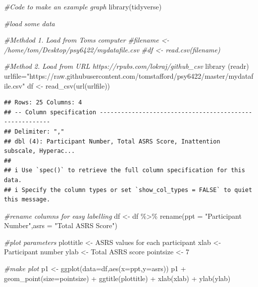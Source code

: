 \documentclass[
  12pt,
  a5paper,
]{book}
\newenvironment{Shaded}{\begin{snugshade}}{\end{snugshade}}
\newcommand{\AttributeTok}[1]{\textcolor[rgb]{0.77,0.63,0.00}{#1}}
\newcommand{\CommentTok}[1]{\textcolor[rgb]{0.56,0.35,0.01}{\textit{#1}}}
\newcommand{\DecValTok}[1]{\textcolor[rgb]{0.00,0.00,0.81}{#1}}
\newcommand{\FunctionTok}[1]{\textcolor[rgb]{0.00,0.00,0.00}{#1}}
\newcommand{\NormalTok}[1]{#1}
\newcommand{\OtherTok}[1]{\textcolor[rgb]{0.56,0.35,0.01}{#1}}
\newcommand{\SpecialCharTok}[1]{\textcolor[rgb]{0.00,0.00,0.00}{#1}}
\newcommand{\StringTok}[1]{\textcolor[rgb]{0.31,0.60,0.02}{#1}}
\begin{document}
\begin{Shaded}
\begin{Highlighting}[]
\CommentTok{\#Code to make an example graph}
\FunctionTok{library}\NormalTok{(tidyverse)}

\CommentTok{\#load some data}

\CommentTok{\#Methdod 1. Load from Tom\textquotesingle{}s computer}
\CommentTok{\#filename \textless{}{-} \textquotesingle{}/home/tom/Desktop/psy6422/mydatafile.csv\textquotesingle{}}
\CommentTok{\#df \textless{}{-} read.csv(filename)}

\CommentTok{\#Method 2. Load from URL https://rpubs.com/lokraj/github\_csv}
\FunctionTok{library}\NormalTok{ (readr)}
\NormalTok{urlfile}\OtherTok{=}\StringTok{"https://raw.githubusercontent.com/tomstafford/psy6422/master/mydatafile.csv"}
\NormalTok{df }\OtherTok{\textless{}{-}} \FunctionTok{read\_csv}\NormalTok{(}\FunctionTok{url}\NormalTok{(urlfile))}
\end{Highlighting}
\end{Shaded}

\begin{verbatim}
## Rows: 25 Columns: 4
## -- Column specification --------------------------------------------------------
## Delimiter: ","
## dbl (4): Participant Number, Total ASRS Score, Inattention subscale, Hyperac...
## 
## i Use `spec()` to retrieve the full column specification for this data.
## i Specify the column types or set `show_col_types = FALSE` to quiet this message.
\end{verbatim}

\begin{Shaded}
\begin{Highlighting}[]
\CommentTok{\#rename columns for easy labelling}
\NormalTok{df }\OtherTok{\textless{}{-}}\NormalTok{ df }\SpecialCharTok{\%\textgreater{}\%} \FunctionTok{rename}\NormalTok{(}\AttributeTok{ppt =} \StringTok{"Participant Number"}\NormalTok{,}\AttributeTok{asrs =} \StringTok{"Total ASRS Score"}\NormalTok{)}

\CommentTok{\#plot parameters}
\NormalTok{plottitle  }\OtherTok{\textless{}{-}}  \StringTok{\textquotesingle{}ASRS values for each participant\textquotesingle{}}
\NormalTok{xlab  }\OtherTok{\textless{}{-}}  \StringTok{\textquotesingle{}Participant number\textquotesingle{}}
\NormalTok{ylab  }\OtherTok{\textless{}{-}}  \StringTok{\textquotesingle{}Total ASRS score\textquotesingle{}}
\NormalTok{pointsize  }\OtherTok{\textless{}{-}}  \DecValTok{7}

\CommentTok{\#make plot}
\NormalTok{p1 }\OtherTok{\textless{}{-}} \FunctionTok{ggplot}\NormalTok{(}\AttributeTok{data=}\NormalTok{df,}\FunctionTok{aes}\NormalTok{(}\AttributeTok{x=}\NormalTok{ppt,}\AttributeTok{y=}\NormalTok{asrs))}
\NormalTok{p1 }\SpecialCharTok{+} \FunctionTok{geom\_point}\NormalTok{(}\AttributeTok{size=}\NormalTok{pointsize) }\SpecialCharTok{+}
  \FunctionTok{ggtitle}\NormalTok{(plottitle) }\SpecialCharTok{+}
  \FunctionTok{xlab}\NormalTok{(xlab) }\SpecialCharTok{+}
  \FunctionTok{ylab}\NormalTok{(ylab)}
\end{Highlighting}
\end{Shaded}
\end{document}
